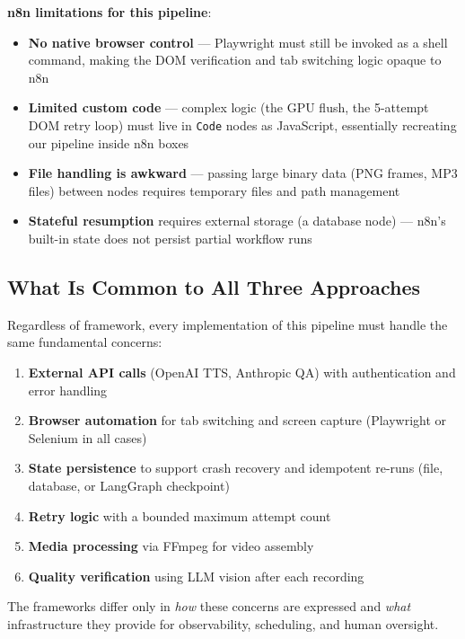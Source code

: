 \documentclass[12pt,a4paper]{article}
\begin{document}
\textbf{n8n limitations for this pipeline}:
\begin{itemize}[leftmargin=2em]
  \item \textbf{No native browser control} --- Playwright must still be invoked
        as a shell command, making the DOM verification and tab switching logic
        opaque to n8n
  \item \textbf{Limited custom code} --- complex logic (the GPU flush, the
        5-attempt DOM retry loop) must live in \texttt{Code} nodes as JavaScript,
        essentially recreating our pipeline inside n8n boxes
  \item \textbf{File handling is awkward} --- passing large binary data (PNG
        frames, MP3 files) between nodes requires temporary files and path
        management
  \item \textbf{Stateful resumption} requires external storage (a database node)
        --- n8n's built-in state does not persist partial workflow runs
\end{itemize}

\subsection{What Is Common to All Three Approaches}

Regardless of framework, every implementation of this pipeline must handle the
same fundamental concerns:

\begin{enumerate}[leftmargin=2em]
  \item \textbf{External API calls} (OpenAI TTS, Anthropic QA) with
        authentication and error handling
  \item \textbf{Browser automation} for tab switching and screen capture
        (Playwright or Selenium in all cases)
  \item \textbf{State persistence} to support crash recovery and idempotent
        re-runs (file, database, or LangGraph checkpoint)
  \item \textbf{Retry logic} with a bounded maximum attempt count
  \item \textbf{Media processing} via FFmpeg for video assembly
  \item \textbf{Quality verification} using LLM vision after each recording
\end{enumerate}

The frameworks differ only in \emph{how} these concerns are expressed and
\emph{what} infrastructure they provide for observability, scheduling, and
human oversight.
\end{document}
